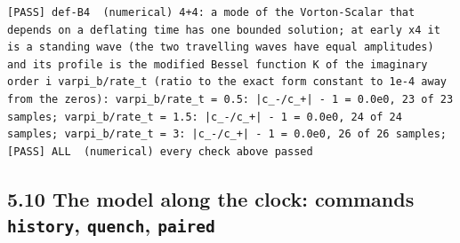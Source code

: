 \documentclass[
  10pt,
]{article}
\begin{document}
\begin{verbatim}
[PASS] def-B4  (numerical) 4+4: a mode of the Vorton-Scalar that depends on a deflating time has one bounded solution; at early x4 it is a standing wave (the two travelling waves have equal amplitudes) and its profile is the modified Bessel function K of the imaginary order i varpi_b/rate_t (ratio to the exact form constant to 1e-4 away from the zeros): varpi_b/rate_t = 0.5: |c_-/c_+| - 1 = 0.0e0, 23 of 23 samples; varpi_b/rate_t = 1.5: |c_-/c_+| - 1 = 0.0e0, 24 of 24 samples; varpi_b/rate_t = 3: |c_-/c_+| - 1 = 0.0e0, 26 of 26 samples;
[PASS] ALL  (numerical) every check above passed
\end{verbatim}

\hypertarget{the-model-along-the-clock-commands-history-quench-paired}{%
\subsection{\texorpdfstring{5.10 The model along the clock: commands
\texttt{history}, \texttt{quench},
\texttt{paired}}{5.10 The model along the clock: commands history, quench, paired}}\label{the-model-along-the-clock-commands-history-quench-paired}}
\end{document}
